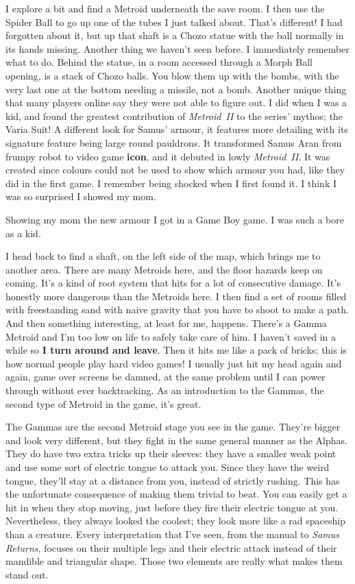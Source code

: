 \documentclass{book}
\begin{document}
I explore a bit and find a Metroid underneath the save room. I then use the Spider Ball to go up one of the tubes I just talked about. That’s different! I had forgotten about it, but up that shaft is a Chozo statue with the ball normally in its hands missing. Another thing we haven’t seen before. I immediately remember what to do. Behind the statue, in a room accessed through a Morph Ball opening, is a stack of Chozo balls. You blow them up with the bombs, with the very last one at the bottom needing a missile, not a bomb. Another unique thing that many players online say they were not able to figure out. I did when I was a kid, and found the greatest contribution of \emph{Metroid~II} to the series’ mythos; the Varia Suit! A different look for Samus’ armour, it features more detailing with its signature feature being large round pauldrons. It transformed Samus Aran from frumpy robot to video game \textbf{icon}, and it debuted in lowly \emph{Metroid~II}. It was created since colours could not be used to show which armour you had, like they did in the first game. I remember being shocked when I first found it. I think I was so surprised I showed my mom.

Showing my mom the new armour I got in a Game Boy game. I was such a bore as a kid.

I head back to find a shaft, on the left side of the map, which brings me to another area. There are many Metroids here, and the floor hazards keep on coming. It’s a kind of root system that hits for a lot of consecutive damage. It’s honestly more dangerous than the Metroids here. I then find a set of rooms filled with freestanding sand with naive gravity that you have to shoot to make a path. And then something interesting, at least for me, happens. There’s a Gamma Metroid and I’m too low on life to safely take care of him. I haven’t saved in a while so \textbf{I turn around and leave}. Then it hits me like a pack of bricks; this is how normal people play hard video games! I usually just hit my head again and again, game over screens be damned, at the same problem until I can power through without ever backtracking. As an introduction to the Gammas, the second type of Metroid in the game, it’s great.

The Gammas are the second Metroid stage you see in the game. They’re bigger and look very different, but they fight in the same general manner as the Alphas. They do have two extra tricks up their sleeves: they have a smaller weak point and use some sort of electric tongue to attack you. Since they have the weird tongue, they’ll stay at a distance from you, instead of strictly rushing. This has the unfortunate consequence of making them trivial to beat. You can easily get a hit in when they stop moving, just before they fire their electric tongue at you. Nevertheless, they always looked the coolest; they look more like a rad spaceship than a creature. Every interpretation that I’ve seen, from the manual to \emph{Samus Returns}, focuses on their multiple legs and their electric attack instead of their mandible and triangular shape. Those two elements are really what makes them stand out.
\end{document}
